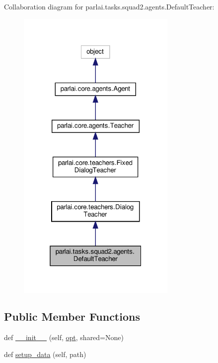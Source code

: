 Collaboration diagram for parlai.\+tasks.\+squad2.\+agents.\+Default\+Teacher\+:\nopagebreak
\begin{figure}[H]
\begin{center}
\leavevmode
\includegraphics[width=217pt]{d9/db9/classparlai_1_1tasks_1_1squad2_1_1agents_1_1DefaultTeacher__coll__graph}
\end{center}
\end{figure}
\subsection*{Public Member Functions}
\begin{DoxyCompactItemize}
\item 
def \hyperlink{classparlai_1_1tasks_1_1squad2_1_1agents_1_1DefaultTeacher_aa97ab84de16c6d73501fef0c11bb1608}{\+\_\+\+\_\+init\+\_\+\+\_\+} (self, \hyperlink{classparlai_1_1core_1_1agents_1_1Teacher_a3ce6243860ce978a897922863ed32fa4}{opt}, shared=None)
\item 
def \hyperlink{classparlai_1_1tasks_1_1squad2_1_1agents_1_1DefaultTeacher_a68185506bbbcaadaee2dbf5162483437}{setup\+\_\+data} (self, path)
\end{DoxyCompactItemize}
